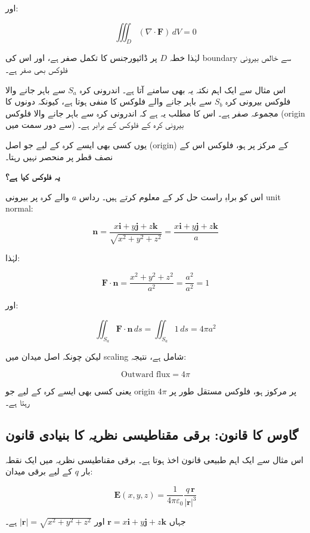 \begin{enumerate}
اور:

\[
\iiint_D (\nabla \cdot \mathbf{F})\, dV = 0
\]

لہٰذا خطہ \( D \) پر ڈائیورجنس کا تکمل صفر ہے، اور اس کی boundary سے خالص بیرونی فلوکس بھی صفر ہے۔

\bigskip

اس مثال سے ایک اہم نکتہ یہ بھی سامنے آتا ہے۔ اندرونی کرہ \( S_a \) سے باہر جانے والا فلوکس بیرونی کرہ \( S_b \) سے باہر جانے والے فلوکس کا منفی ہوتا ہے، کیونکہ دونوں کا مجموعہ صفر ہے۔ اس کا مطلب یہ ہے کہ اندرونی کرہ سے باہر جانے والا فلوکس (origin سے دور سمت میں) بیرونی کرہ کے فلوکس کے برابر ہے۔

یوں کسی بھی ایسے کرہ کے لیے جو اصل (origin) کے مرکز پر ہو، فلوکس اس کے نصف قطر پر منحصر نہیں رہتا۔

\bigskip

\textbf{یہ فلوکس کیا ہے؟}

اس کو براہِ راست حل کر کے معلوم کرتے ہیں۔ رداس \( a \) والے کرہ پر بیرونی unit normal:

\[
\mathbf{n}
=
\frac{x\mathbf{i} + y\mathbf{j} + z\mathbf{k}}{\sqrt{x^2 + y^2 + z^2}}
=
\frac{x\mathbf{i} + y\mathbf{j} + z\mathbf{k}}{a}
\]

لہٰذا:

\[
\mathbf{F}\cdot \mathbf{n}
=
\frac{x^2 + y^2 + z^2}{a^2}
=
\frac{a^2}{a^2}
=
1
\]

اور:

\[
\iint_{S_a} \mathbf{F}\cdot \mathbf{n}\, ds
=
\iint_{S_a} 1\, ds
=
4\pi a^2
\]

لیکن چونکہ اصل میدان میں scaling شامل ہے، نتیجہ:

\[
\text{Outward flux} = 4\pi
\]

یعنی کسی بھی ایسے کرہ کے لیے جو origin پر مرکوز ہو، فلوکس مستقل طور پر \( 4\pi \) رہتا ہے۔

\bigskip

\subsection*{گاوس کا قانون: برقی مقناطیسی نظریہ کا بنیادی قانون}

اس مثال سے ایک اہم طبیعی قانون اخذ ہوتا ہے۔ برقی مقناطیسی نظریہ میں ایک نقطہ بار \( q \) کے لیے برقی میدان:

\[
\mathbf{E}(x,y,z)
=
\frac{1}{4\pi \varepsilon_0}
\frac{q\,\mathbf{r}}{|\mathbf{r}|^3}
\]

جہاں \( \mathbf{r} = x\mathbf{i} + y\mathbf{j} + z\mathbf{k} \) اور \( |\mathbf{r}| = \sqrt{x^2+y^2+z^2} \) ہے۔


\end{enumerate}
